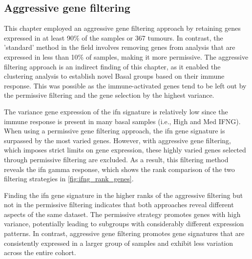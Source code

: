 \subsection*{Aggressive gene filtering}


This chapter employed an aggressive gene filtering approach by retaining genes expressed in at least 90\% of the samples or 367 tumours. In contrast, the 'standard' method in the field involves removing genes from analysis that are expressed in less than 10\% of samples, making it more permissive. The aggressive filtering approach is an indirect finding of this chapter, as it enabled the clustering analysis to establish novel Basal groups based on their immune response. This was possible as the immune-activated genes tend to be left out by the permissive filtering and the gene selection by the highest variance. 

The variance gene expression of the \acrshort{ifn} signature is relatively low since the immune response is present in many basal samples (i.e., High and Med IFNG). When using a permissive gene filtering approach, the \acrshort{ifn} gene signature is surpassed by the most varied genes. However, with aggressive gene filtering, which imposes strict limits on gene expression, these highly varied genes selected through permissive filtering are excluded. As a result, this filtering method reveals the \acrlong{ifn} gamma response, which shows the rank comparison of the two filtering strategies in \cref{fig:ifng_rank_genes}.

Finding the \acrlong{ifn} gene signature in the higher ranks of the aggressive filtering but not in the permissive filtering indicates that both approaches reveal different aspects of the same dataset. The permissive strategy promotes genes with high variance, potentially leading to subgroups with considerably different expression patterns. In contrast, aggressive gene filtering promotes gene signatures that are consistently expressed in a larger group of samples and exhibit less variation across the entire cohort.


